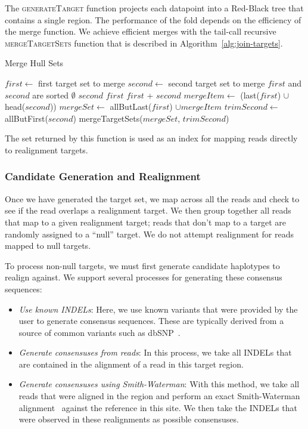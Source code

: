 \documentclass[phd]{ucbthesis}
\begin{document}
The \textsc{generateTarget} function projects each datapoint into a Red-Black tree that contains a
single region. The performance of the fold depends on the efficiency of the merge function. We achieve
efficient merges with the tail-call recursive \textsc{mergeTargetSets} function that is described in
Algorithm~\ref{alg:join-targets}.

\begin{algorithm}
\caption{Merge Hull Sets}
\label{alg:join-targets}
\begin{algorithmic}
\STATE $first \leftarrow$ first target set to merge
\STATE $second \leftarrow$ second target set to merge
\REQUIRE $first$ and $second$ are sorted
\RETURN $\emptyset$
\RETURN $second$
\RETURN $first$
\ELSE
{}
\RETURN $first$ + $second$
\ELSE
\STATE $mergeItem \leftarrow$ (last($first$) $\cup$ head($second$))
\STATE $mergeSet \leftarrow$ allButLast($first$) $\cup mergeItem$
\STATE $trimSecond \leftarrow$ allButFirst($second$)
\RETURN mergeTargetSets($mergeSet$, $trimSecond$)
\ENDIF
\ENDIF
\end{algorithmic}
\end{algorithm}

The set returned by this function is used as an index for mapping reads directly to realignment targets.

\subsubsection{Candidate Generation and Realignment}
\label{sec:candidate-generation-realignment}

Once we have generated the target set, we map across all the reads and check to see if the read overlaps
a realignment target. We then group together all reads that map to a given realignment target; reads that
don't map to a target are randomly assigned to a ``null'' target. We do not attempt realignment for reads mapped
to null targets.

To process non-null targets, we must first generate candidate haplotypes to realign against. We support several
processes for generating these consensus sequences:

\begin{itemize}
\item \emph{Use known INDELs}: Here, we use known variants that were provided by the user to generate
consensus sequences. These are typically derived from a source of common variants such as dbSNP~\cite{sherry01}.
\item \emph{Generate consensuses from reads}: In this process, we take all INDELs that are contained in
the alignment of a read in this target region.
\item \emph{Generate consensuses using Smith-Waterman}: With this method, we take all reads that were
aligned in the region and perform an exact Smith-Waterman alignment~\cite{smith81} against the reference in this site. We
then take the INDELs that were observed in these realignments as possible consensuses. 
\end{itemize}
\end{document}
